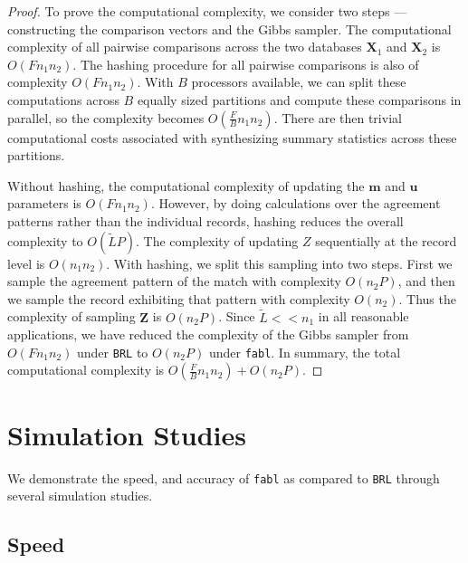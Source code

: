 \documentclass[ba]{imsart}
\begin{document}
	\begin{proof}
		To prove the computational complexity, we consider two steps --- constructing the comparison vectors and the Gibbs sampler. 
		The computational complexity of all pairwise comparisons across the two databases $\bm{X}_1$ and $\bm{X}_2$ is $O(F n_1 n_2)$. The hashing procedure for all pairwise comparisons is also of complexity $O(F n_1 n_2)$. With $B$ processors available, we can split these computations across $B$ equally sized partitions and compute these comparisons in parallel, so the complexity becomes $O(\frac{F}{B} n_1 n_2)$. There are then trivial computational costs associated with synthesizing summary statistics across these partitions. 
		
		Without hashing, the computational complexity of updating the $\bm{m}$ and $\bm{u}$ parameters is $O(F n_1 n_2)$. However, by doing calculations over the agreement patterns rather than the individual records, hashing reduces the overall complexity to $O(\tilde{L}P)$. The complexity of updating $Z$ sequentially at the record level is $O(n_1 n_2)$. With hashing, we split this sampling into two steps. First we sample the agreement pattern of the match with complexity $O(n_2 P)$, and then we sample the record exhibiting that pattern with complexity $O(n_2)$. Thus the complexity of sampling $\bm{Z}$ is $O(n_2 P)$. Since $\tilde{L} << n_1$ in all reasonable applications, we have reduced the complexity of the Gibbs sampler from $O(F n_1 n_2)$ under \texttt{BRL} to $O(n_2 P)$ under \texttt{fabl}.
		In summary, the total computational complexity is $O(\frac{F}{B} n_1 n_2) + O(n_2 P).$
	\end{proof} 
	
	\section{Simulation Studies}
	\label{sec:simulations}
	
	We demonstrate the speed, and accuracy of \texttt{fabl} as compared to \texttt{BRL} through several simulation studies. 
	
	\hypertarget{speed}{%
		\subsection{Speed}\label{speed}}
	
\end{document}
